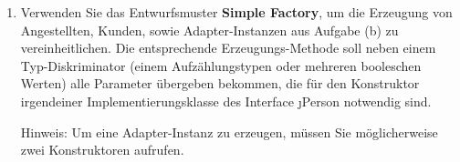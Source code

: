 \documentclass{lehramt-informatik-aufgabe}
\begin{document}
\begin{enumerate}
\begin{liExkurs}
\liEntwurfsAdapter
\end{liExkurs}


\item Verwenden Sie das Entwurfsmuster \textbf{Simple Factory}, um die
Erzeugung von Angestellten, Kunden, sowie Adapter-Instanzen aus Aufgabe
(b) zu vereinheitlichen. Die entsprechende Erzeugungs-Methode soll neben
einem Typ-Diskriminator (\zB einem Aufzählungstypen oder mehreren
booleschen Werten) alle Parameter übergeben bekommen, die für den
Konstruktor irgendeiner Implementierungsklasse des Interface \j{Person}
notwendig sind.

Hinweis: Um eine Adapter-Instanz zu erzeugen, müssen Sie möglicherweise
zwei Konstruktoren aufrufen.

\begin{liExkurs}
\liEntwurfsEinfacheFabrik
\end{liExkurs}

\end{enumerate}
\end{document}
